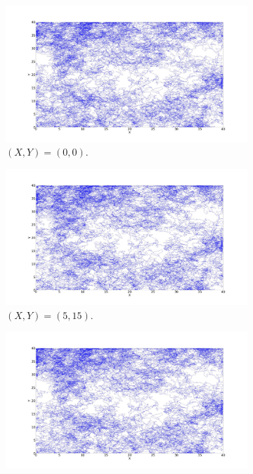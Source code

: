\begin{figure}[ht]
	\centering
	\begin{subfigure}[b]{0.55\textwidth}
		\centering
		\includegraphics[width=\textwidth]{LateX images/log/XY1/g1-1.9}
		\caption{$(X,Y) = (0,0)$.}
		\label{f:g88}
	\end{subfigure}
	\hfill
	\begin{subfigure}[b]{0.55\textwidth}
		\centering
		\includegraphics[width=\textwidth]{LateX images/log/XY1/g2-1.9}
		\caption{$(X,Y) = (5,15)$.}
		\label{f:g89}
	\end{subfigure}
	\hfill
	\begin{subfigure}[b]{0.55\textwidth}
		\centering
		\includegraphics[width=\textwidth]{LateX images/log/XY1/g3-1.9}

\end{subfigure}
\end{figure}
